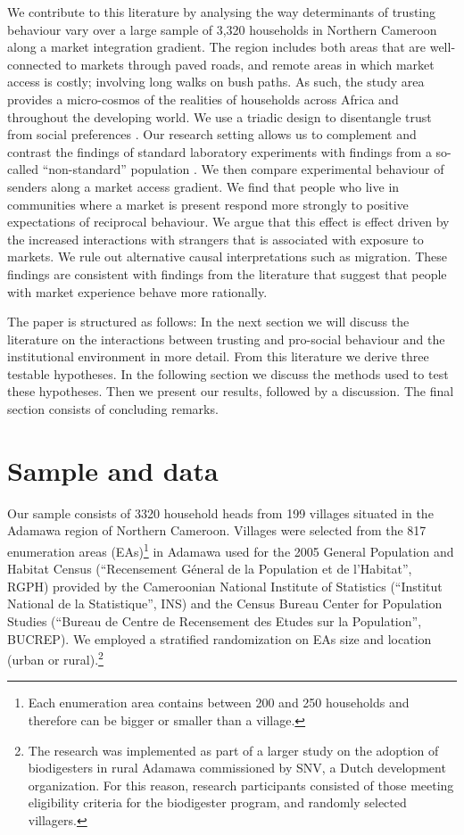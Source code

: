 We contribute to this literature by analysing the way determinants of trusting behaviour vary over a large sample of 3,320 households in Northern Cameroon along a market integration gradient. The region includes both areas that are well-connected to markets through paved roads, and remote areas in which market access is costly; involving long walks on bush paths. As such, the study area provides a micro-cosmos of the realities of households across Africa and throughout the developing world.  We use a triadic design to disentangle trust from social preferences \cite{Cox2004,Ashraf2006}. Our research setting allows us to complement and contrast the findings of standard laboratory experiments with findings from a so-called “non-standard” population \citep{Henrich2010a}. We then compare experimental behaviour of senders along a market access gradient. We find that people who live in communities where a market is present respond more strongly to positive expectations of reciprocal behaviour. We argue that this effect is effect driven by the increased interactions with strangers that is associated with exposure to markets. We rule out alternative causal interpretations such as migration. These findings are consistent with findings from the literature that suggest that people with market experience behave more rationally.

The paper is structured as follows: In the next section we will discuss the literature on the interactions between trusting and pro-social behaviour and the institutional environment in more detail. From this literature we derive three testable hypotheses. In the following section we discuss the methods used to test these hypotheses. Then we present our results, followed by a discussion. The final section consists of concluding remarks.




\section{Sample and data}



Our sample consists of 3320 household heads from 199 villages situated in the Adamawa region of Northern Cameroon. Villages were selected from the 817 enumeration areas (EAs)\footnote{Each enumeration area contains between 200 and 250 households and therefore can be bigger or smaller than a village.} in Adamawa used for the 2005 General Population and Habitat Census (``Recensement Géneral de la Population et de l’Habitat'', RGPH) provided by the Cameroonian National Institute of Statistics (``Institut National de la Statistique'', INS) and the Census Bureau Center for Population Studies (``Bureau de Centre de Recensement des Etudes sur la Population'', BUCREP). We employed a stratified randomization on EAs size and location (urban or rural).\footnote{The research was implemented as part of a larger study on the adoption of biodigesters in rural Adamawa commissioned by SNV, a Dutch development organization. For this reason, research participants consisted of those meeting eligibility criteria for the biodigester program, and randomly selected villagers.} 

